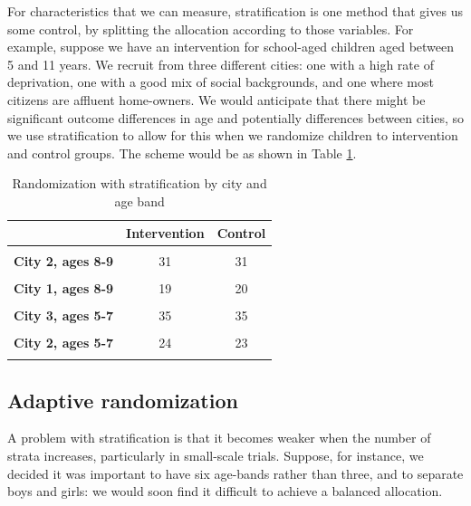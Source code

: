 \documentclass{krantz}
\begin{document}
For characteristics that we can measure, stratification is one method that gives us some control, by splitting the allocation according to those variables. For example, suppose we have an intervention for school-aged children aged between 5 and 11 years. We recruit from three different cities: one with a high rate of deprivation, one with a good mix of social backgrounds, and one where most citizens are affluent home-owners. We would anticipate that there might be significant outcome differences in age and potentially differences between cities, so we use stratification to allow for this when we randomize children to intervention and control groups. The scheme would be as shown in Table \ref{tab:strattable}.

\begin{table}

\caption{\label{tab:strattable}Randomization with stratification by city and age band}
\centering
\begin{tabular}[t]{>{}lcc}
\toprule
  & Intervention & Control\\
\midrule
\textbf{\cellcolor{gray!6}{City 1, ages 5-7}} & \cellcolor{gray!6}{23} & \cellcolor{gray!6}{24}\\
\textbf{City 2, ages 8-9} & 31 & 31\\
\textbf{\cellcolor{gray!6}{City 3, ages 10-11}} & \cellcolor{gray!6}{28} & \cellcolor{gray!6}{27}\\
\textbf{City 1, ages 8-9} & 19 & 20\\
\textbf{\cellcolor{gray!6}{Cityl 2, ages 10-11}} & \cellcolor{gray!6}{25} & \cellcolor{gray!6}{24}\\
\addlinespace
\textbf{City 3, ages 5-7} & 35 & 35\\
\textbf{\cellcolor{gray!6}{City 1, ages 10-11}} & \cellcolor{gray!6}{22} & \cellcolor{gray!6}{27}\\
\textbf{City 2, ages 5-7} & 24 & 23\\
\textbf{\cellcolor{gray!6}{City 3, ages 8-9}} & \cellcolor{gray!6}{31} & \cellcolor{gray!6}{31}\\
\bottomrule
\end{tabular}
\end{table}

\hypertarget{adaptive-randomization}{%
\subsection{Adaptive randomization}\label{adaptive-randomization}}

A problem with stratification is that it becomes weaker when the number of strata increases, particularly in small-scale trials. Suppose, for instance, we decided it was important to have six age-bands rather than three, and to separate boys and girls: we would soon find it difficult to achieve a balanced allocation.
\end{document}

